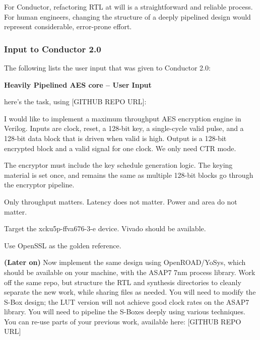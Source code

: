For Conductor, refactoring RTL at will is a straightforward and reliable process. For human engineers, changing the structure of a deeply pipelined design would represent considerable, error-prone effort.

\subsubsection{Input to Conductor 2.0}

The following lists the user input that was given to Conductor 2.0:

\begin{tcolorbox}[
	colback=white,
	colframe=black,
	coltext=vrkblue,
	breakable,
	fontupper=\scriptsize\fontfamily{pcr}\selectfont,
	before upper={\RaggedRight}
	]
	\textbf{Heavily Pipelined AES core -- User Input}
	\par\smallskip
	
	here's the task, using [GITHUB REPO URL]:
	\par\smallskip
	
	I would like to implement a maximum throughput AES encryption engine in Verilog. Inputs are clock, reset, a 128-bit key, a single-cycle valid pulse, and a 128-bit data block that is driven when valid is high. Output is a 128-bit encrypted block and a valid signal for one clock. We only need CTR mode.
	\par\smallskip
	
	The encryptor must include the key schedule generation logic. The keying material is set once, and remains the same as multiple 128-bit blocks go through the encryptor pipeline.
	\par\smallskip
	
	Only throughput matters. Latency does not matter. Power and area do not matter.
	\par\smallskip
	
	Target the xcku5p-ffva676-3-e device. Vivado should be available.
	\par\smallskip
	
	Use OpenSSL as the golden reference.
	\par\smallskip
	
	\textbf{(Later on)} Now implement the same design using OpenROAD/YoSys, which should be available on your machine, with the ASAP7 7nm process library. Work off the same repo, but structure the RTL and synthesis directories to cleanly separate the new work, while sharing files as needed. You will need to modify the S-Box design; the LUT version will not achieve good clock rates on the ASAP7 library. You will need to pipeline the S-Boxes deeply using various techniques. You can re-use parts of your previous work, available here: [GITHUB REPO URL]
\end{tcolorbox}

